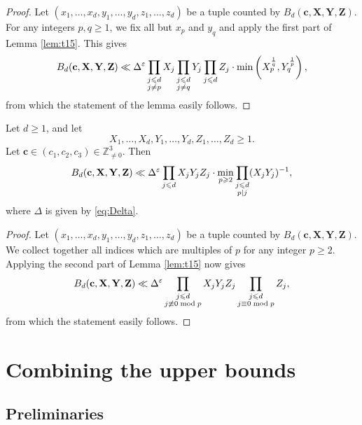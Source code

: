 \begin{proof}
Let $(x_1,\ldots, x_d,y_1,\ldots, y_d,z_1,\ldots, z_d)$ be a tuple counted by $B_d(\mathbf{c},\mathbf{X},\mathbf{Y},\mathbf{Z})$.
For any integers $p,q\geq 1$, we fix all but $x_p$ and $y_q$ and apply
the first part of  Lemma \ref{lem:t15}. This gives
$$
B_d(\mathbf{c},\mathbf{X},\mathbf{Y},\mathbf{Z})  \ll
\Delta^\varepsilon \prod_{\substack{j\leqslant d\\ j\neq p }} X_j
\prod_{\substack{j\leqslant d\\ j\neq q }} Y_j
\prod_{\substack{j\leqslant d }} Z_j \cdot
\min\left( X_p^{\frac{1}{q}} , Y_q^{\frac{1}{p}}\right) ,
$$
from which the  statement of the lemma easily follows.
\end{proof}





\begin{proposition} \label{prop:thue}
Let $d\geq 1$, and let
$$
X_1,\ldots, X_d, Y_1,\ldots, Y_d,Z_1,\ldots, Z_d\geq 1.
$$
Let $\mathbf{c}\in (c_1,c_2,c_3)\in \mathbb{Z}_{\neq 0}^3$.
Then
$$
B_d(\mathbf{c},\mathbf{X},\mathbf{Y},\mathbf{Z})  \ll
\Delta^\varepsilon \prod_{j\leqslant d} X_jY_jZ_j \cdot
\min_{p\geqslant 2}
\prod_{\substack{j\leqslant d \\ p\mid j}} (X_jY_j)^{-1},
$$
where $\Delta$ is given by \eqref{eq:Delta}.
\end{proposition}


\begin{proof}
Let $(x_1,\ldots, x_d,y_1,\ldots, y_d,z_1,\ldots, z_d)$ be a tuple counted by $B_d(\mathbf{c},\mathbf{X},\mathbf{Y},\mathbf{Z})$.
We collect together all indices which are multiples of $p$ for any integer $p\geq 2$.
Applying the second part of  Lemma \ref{lem:t15} now gives
$$
B_d(\mathbf{c},\mathbf{X},\mathbf{Y},\mathbf{Z})  \ll
\Delta^\varepsilon \prod_{\substack{j\leqslant d\\ j\not\equiv 0 \bmod{p} }} X_jY_jZ_j
 \prod_{\substack{j\leqslant d\\ j\equiv 0 \bmod{p} }} Z_j,
$$
from which the statement easily follows.
\end{proof}



\section{Combining the upper bounds }

\subsection{Preliminaries}

